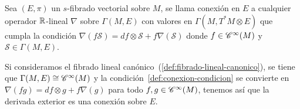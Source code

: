 \begin{definition}
  Sea $(E, \pi)$ un $s$-fibrado vectorial sobre $M$, se llama conexión en $E$ a cualquier operador $\mathbb{R}$-lineal
  $\nabla$ sobre $\Gamma(M, E)$ con valores en $\Gamma(M, T^* M\otimes E)$ que cumpla la condición $\nabla(f\mathcal{S})=df\otimes \mathcal{S}+f\nabla(\mathcal{S})$\label{def:conexion-condicion} donde $f\in\mathscr{C}^\infty(M)$ y
  $\mathcal{S}\in\Gamma(M, E)$.
\end{definition}

\begin{example}
Si consideramos el fibrado lineal canónico~(\ref{def:fibrado-lineal-canonico}), se tiene que $\Gamma(M, E)
\cong\mathscr{C}^\infty(M)$ y la condición~\ref{def:conexion-condicion} se convierte en $\nabla(fg)=df\otimes g+f\nabla(g)$
para todo $f,g\in\mathscr{C}^\infty(M)$, tenemos así que la derivada exterior es una conexión sobre $E$.
\end{example}
